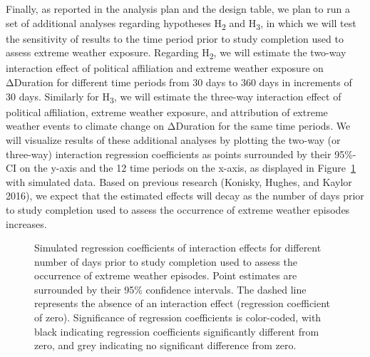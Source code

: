 \documentclass[
  letterpaper,
  DIV=11,
  numbers=noendperiod]{scrartcl}
\begin{document}
Finally, as reported in the analysis plan and the design table, we plan
to run a set of additional analyses regarding hypotheses
H\textsubscript{2} and H\textsubscript{3}, in which we will test the
sensitivity of results to the time period prior to study completion used
to assess extreme weather exposure. Regarding H\textsubscript{2}, we
will estimate the two-way interaction effect of political affiliation
and extreme weather exposure on ΔDuration for different time periods
from 30 days to 360 days in increments of 30 days. Similarly for
H\textsubscript{3}, we will estimate the three-way interaction effect of
political affiliation, extreme weather exposure, and attribution of
extreme weather events to climate change on ΔDuration for the same time
periods. We will visualize results of these additional analyses by
plotting the two-way (or three-way) interaction regression coefficients
as points surrounded by their 95\%-CI on the y-axis and the 12 time
periods on the x-axis, as displayed in Figure~\ref{fig-p.sensitivity}
with simulated data. Based on previous research (Konisky, Hughes, and
Kaylor 2016), we expect that the estimated effects will decay as the
number of days prior to study completion used to assess the occurrence
of extreme weather episodes increases.

\begin{figure}[h]


\caption{\label{fig-p.sensitivity}Simulated regression coefficients of
interaction effects for different number of days prior to study
completion used to assess the occurrence of extreme weather episodes.
Point estimates are surrounded by their 95\% confidence intervals. The
dashed line represents the absence of an interaction effect (regression
coefficient of zero). Significance of regression coefficients is
color-coded, with black indicating regression coefficients significantly
different from zero, and grey indicating no significant difference from
zero.}

\end{figure}%
\end{document}
